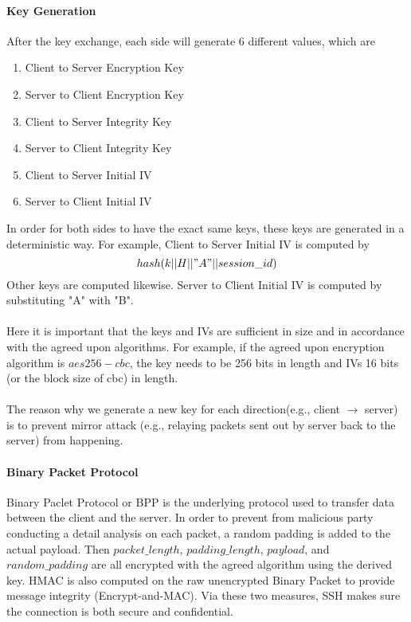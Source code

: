 \documentclass[10pt,sigconf]{acmart}
\begin{document}
\paragraph{\textbf{Key Generation}} After the key exchange, each side will generate 6 different values, which are 
\begin{enumerate}
  \item Client to Server Encryption Key
  \item Server to Client Encryption Key
  \item Client to Server Integrity Key
  \item Server to Client Integrity Key
  \item Client to Server Initial IV  
  \item Server to Client Initial IV
\end{enumerate}
In order for both sides to have the exact same keys, these keys are generated in a deterministic way. For example, Client to Server Initial IV is computed by \[
  hash(k || H || "A" || session\_id)
\] Other keys are computed likewise. Server to Client Initial IV is computed by substituting "A" with "B". \\\\
Here it is important that the keys and IVs are sufficient in size and in accordance with the agreed upon algorithms. For example, if the agreed upon encryption algorithm is $aes256-cbc$, the key needs to be 256 bits in length and IVs 16 bits (or the block size of cbc) in length.\\\\
The reason why we generate a new key for each direction(e.g., client $\rightarrow$ server) is to prevent mirror attack  (e.g., relaying packets sent out by server back to the server) from happening. 
\paragraph{\textbf{Binary Packet Protocol}}
Binary Paclet Protocol or BPP is the underlying protocol used to transfer data between the client and the server. In order to prevent from malicious party conducting a detail analysis on each packet, a random padding is added to the actual payload. Then $packet\_length$, $padding\_length$, $payload$, and $random\_padding$ are all encrypted with the agreed algorithm using the derived key. HMAC is also computed on the raw unencrypted Binary Packet to provide message integrity (Encrypt-and-MAC). Via these two measures, SSH makes sure the connection is both secure and confidential.
\end{document}
